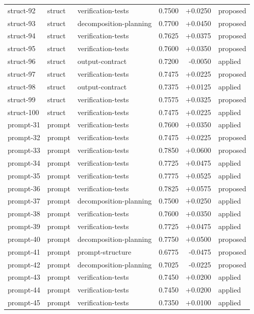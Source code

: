 \begin{center}
\begin{longtable}{llp{5.2cm}rrl}
struct-92 & struct & verification-tests & 0.7500 & +0.0250 & proposed \\
struct-93 & struct & decomposition-planning & 0.7700 & +0.0450 & proposed \\
struct-94 & struct & verification-tests & 0.7625 & +0.0375 & proposed \\
struct-95 & struct & verification-tests & 0.7600 & +0.0350 & proposed \\
struct-96 & struct & output-contract & 0.7200 & -0.0050 & applied \\
struct-97 & struct & verification-tests & 0.7475 & +0.0225 & proposed \\
struct-98 & struct & output-contract & 0.7375 & +0.0125 & applied \\
struct-99 & struct & verification-tests & 0.7575 & +0.0325 & proposed \\
struct-100 & struct & verification-tests & 0.7475 & +0.0225 & applied \\
prompt-31 & prompt & verification-tests & 0.7600 & +0.0350 & applied \\
prompt-32 & prompt & verification-tests & 0.7475 & +0.0225 & proposed \\
prompt-33 & prompt & verification-tests & 0.7850 & +0.0600 & proposed \\
prompt-34 & prompt & verification-tests & 0.7725 & +0.0475 & applied \\
prompt-35 & prompt & verification-tests & 0.7775 & +0.0525 & applied \\
prompt-36 & prompt & verification-tests & 0.7825 & +0.0575 & proposed \\
prompt-37 & prompt & decomposition-planning & 0.7500 & +0.0250 & applied \\
prompt-38 & prompt & verification-tests & 0.7600 & +0.0350 & applied \\
prompt-39 & prompt & verification-tests & 0.7725 & +0.0475 & applied \\
prompt-40 & prompt & decomposition-planning & 0.7750 & +0.0500 & proposed \\
prompt-41 & prompt & prompt-structure & 0.6775 & -0.0475 & proposed \\
prompt-42 & prompt & decomposition-planning & 0.7025 & -0.0225 & proposed \\
prompt-43 & prompt & verification-tests & 0.7450 & +0.0200 & applied \\
prompt-44 & prompt & verification-tests & 0.7450 & +0.0200 & applied \\
prompt-45 & prompt & verification-tests & 0.7350 & +0.0100 & applied \\

\end{longtable}
\end{center}
